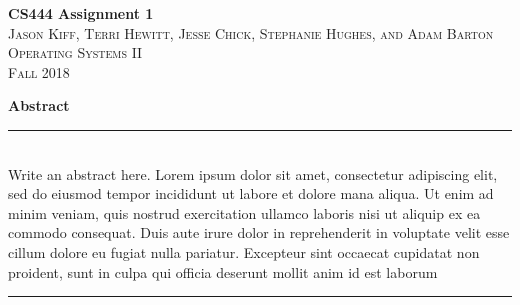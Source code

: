 \documentclass{article}
\begin{document}

\begin{titlepage}
\vspace*{\fill}

\newcommand{\HRule}{\rule{\linewidth}{0.5mm}} %

\center %


{ \huge \bfseries CS444 Assignment 1}\\[0.4cm] %


\textsc{\LARGE Jason Kiff, Terri Hewitt, Jesse Chick, Stephanie Hughes, and Adam Barton}\\[0.5cm] %
\textsc{\Large Operating Systems II}\\[0.5cm] %
\textsc{\large Fall 2018}\\[2.5cm] %


\begin{minipage}{.6\textwidth}
\textbf{\large Abstract} \\
\HRule \\[0.4cm]
Write an abstract here. Lorem ipsum dolor sit amet, consectetur adipiscing elit, sed do eiusmod tempor incididunt ut labore et dolore mana aliqua. Ut enim ad minim veniam, quis nostrud exercitation ullamco laboris nisi ut aliquip ex ea commodo consequat. Duis aute irure dolor in reprehenderit in voluptate velit esse cillum dolore eu fugiat nulla pariatur. Excepteur sint occaecat cupidatat non proident, sunt in culpa qui officia deserunt mollit anim id est laborum
\\[0.4cm]
\HRule \\[1.5cm]
\end{minipage}



\end{titlepage}
\end{document}
